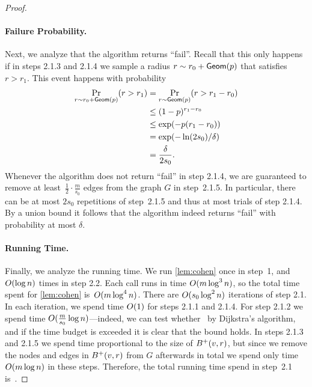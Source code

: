 \documentclass[letterpaper,11pt]{article}
\begin{document}
\begin{proof}
\paragraph{Failure Probability.}
Next, we analyze that the algorithm returns ``fail''. Recall that this only happens if in steps 2.1.3 and 2.1.4 we sample a radius $r \sim r_0 + \textsf{Geom}(p)$ that satisfies~$r > r_1$. This event happens with probability
\begin{align*}
    \Pr_{r \sim r_0 + \textsf{Geom}(p)}(r > r_1) &= \Pr_{r \sim \textsf{Geom}(p)}(r > r_1 - r_0) \\
    &\leq (1 - p)^{r_1 - r_0} \\
    &\leq \exp(-p(r_1 - r_0)) \\
    &= \exp(-\ln(2s_0) / \delta) \\
    &= \frac{\delta}{2s_0}.
\end{align*}
Whenever the algorithm does not return ``fail'' in step 2.1.4, we are guaranteed to remove at least~$\frac{1}{2} \cdot \frac{m}{s_0}$ edges from the graph $G$ in step~2.1.5. In particular, there can be at most $2s_0$ repetitions of step~2.1.5 and thus at most trials of step 2.1.4. By a union bound it follows that the algorithm indeed returns ``fail'' with probability at most $\delta$.

\paragraph{Running Time.}
Finally, we analyze the running time. We run \cref{lem:cohen} once in step~1, and $O(\log n)$ times in step 2.2. Each call runs in time $O(m \log^3 n)$, so the total time spent for \cref{lem:cohen} is~$O(m \log^4 n)$. There are $O(s_0 \log^2 n)$ iterations of step 2.1. In each iteration, we spend time $O(1)$ for steps 2.1.1 and 2.1.4. For step 2.1.2 we spend time $O(\frac{m}{s_0} \log n)$---indeed, we can test whether~ by Dijkstra's algorithm, and if the time budget is exceeded it is clear that the bound holds. In steps 2.1.3 and 2.1.5 we spend time proportional to the size of $B^+(v, r)$, but since we remove the nodes and edges in $B^+(v, r)$ from $G$ afterwards in total we spend only time $O(m \log n)$ in these steps. Therefore, the total running time spend in step~2.1 is~.
\end{proof}
\end{document}
